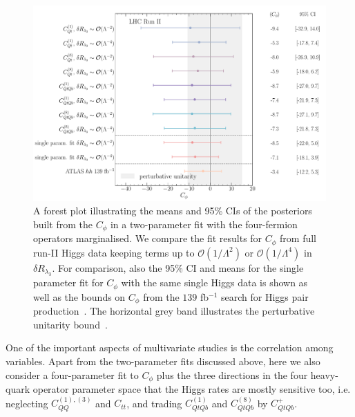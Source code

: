 \begin{figure}[htpb!]
	\begin{center}
		\includegraphics[width=\linewidth]{fig/uebeblick_forest_cphi_LHC_RunII}
	\end{center}
	\caption{A forest plot illustrating the means and 95\% CIs of the posteriors built from the  $C_\phi$  in a two-parameter fit with the four-fermion operators marginalised. We compare the fit results for $C_\phi$ from full run-II Higgs data keeping terms up to $\mathcal{O}(1/\Lambda^2)$ or $\mathcal{O}(1/\Lambda^4)$ in $\delta R_{\lambda_3}$.  For comparison, also the 95\% CI and means for the single parameter fit for $C_\phi$ with the same single Higgs data is shown as well as the bounds on $C_{\phi}$ from the $139$ fb$^{-1}$ search for Higgs pair production~\cite{ATLAS:2021jki}. The horizontal grey band illustrates the perturbative unitarity bound~\cite{DiLuzio:2017tfn}. \label{fig:summcphi}  }
\end{figure}
\par 
One of the important aspects of multivariate studies is the correlation among variables. Apart from the two-parameter fits discussed above, here we also consider a four-parameter fit to $C_\phi$ plus the three directions in the four heavy-quark operator parameter space that the Higgs rates are
mostly sensitive too, i.e. neglecting $C_{QQ}^{(1),(3) }$ and $C_{tt}$, and trading $C_{QtQb}^{(1)}$ and $C_{QtQb}^{(8)}$ by $C_{QtQb}^{+}$.
